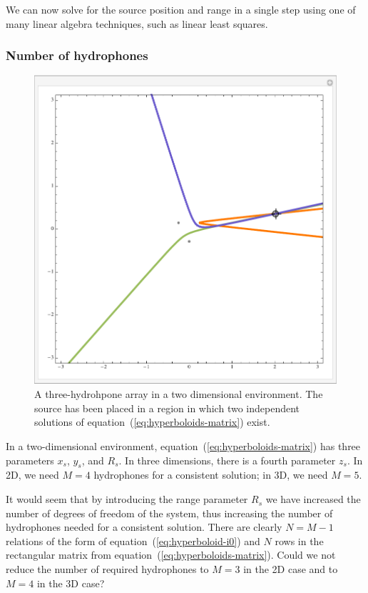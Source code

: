 \documentclass[10pt]{article}
\begin{document}
We can now solve for the source position and range in a single step using one of many linear algebra techniques, such as linear least squares.

\subsubsection{Number of hydrophones}

\begin{figure}[htbp]
\begin{center}
\includegraphics[scale=0.5]{hyperbola-bad.pdf}
\caption{A three-hydrohpone array in a two dimensional environment.  The source has been placed in a region in which two independent solutions of equation~(\ref{eq:hyperboloids-matrix}) exist.}
\label{fig:hyperbola-bad}
\end{center}
\end{figure}

In a two-dimensional environment, equation~(\ref{eq:hyperboloids-matrix})  has three parameters \(x_s\), \(y_s\), and \(R_s\).  In three dimensions, there is a fourth parameter \(z_s\).  In 2D, we need \(M=4\) hydrophones for a consistent solution; in 3D, we need \(M=5\).

It would seem that by introducing the range parameter \(R_s\) we have increased the number of degrees of freedom of the system, thus increasing the number of hydrophones needed for a consistent solution.  There are clearly \(N=M-1\) relations of the form of equation~(\ref{eq:hyperboloid-i0}) and \(N\) rows in the rectangular matrix from equation~(\ref{eq:hyperboloids-matrix}).  Could we not reduce the number of required hydrophones to \(M=3\) in the 2D case and to \(M=4\) in the 3D case?
\end{document}
